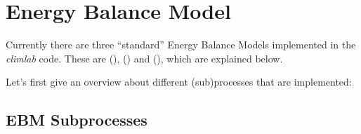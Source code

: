 \documentclass[a4paper,10pt,english]{sphinxmanual}
\begin{document}
\section{Energy Balance Model}
\label{models:energy-balance-model}
Currently there are three ``standard'' Energy Balance Models implemented in the \emph{climlab} code.
These are {\hyperref[api/climlab.model:climlab.model.ebm.EBM]{\emph{}}} (), {\hyperref[api/climlab.model:climlab.model.ebm.EBM_seasonal]{\emph{}}} () and {\hyperref[api/climlab.model:climlab.model.ebm.EBM_annual]{\emph{}}} (), which are explained below.

Let's first give an overview about different (sub)processes that are implemented:


\subsection{EBM Subprocesses}
\label{models:ebm-subprocesses}
\end{document}
